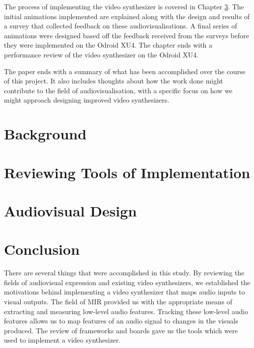 \documentclass{report}
\begin{document}
The process of implementing the video synthesizer is covered in Chapter \ref{chap:avdesign}. The initial animations implemented are explained along with the design and results of a survey that collected feedback on these audiovisualisations. A final series of animations were designed based off the feedback received from the surveys before they were implemented on the Odroid XU4. The chapter ends with a performance review of the video synthesizer on the Odroid XU4. \par

The paper ends with a summary of what has been accomplished over the course of this project. It also includes thoughts about how the work done might contribute to the field of audiovisualisation, with a specific focus on how we might approach designing improved video synthesizers.


\chapter{Background}\label{chap:background}




\chapter{Reviewing Tools of Implementation}\label{chap:toolreview}



\chapter{Audiovisual Design}\label{chap:avdesign}






\chapter{Conclusion}
There are several things that were accomplished in this study. By reviewing the fields of audiovisual expression and existing video synthesizers, we established the motivations behind implementing a video synthesizer that maps audio inputs to visual outputs. The field of MIR provided us with the appropriate means of extracting and measuring low-level audio features. Tracking these low-level audio features allows us to map features of an audio signal to changes in the visuals produced. The review of frameworks and boards gave us the tools which were used to implement a video synthesizer.
\end{document}
